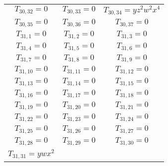 \documentclass[12pt]{memoireuqam1.3}
\begin{document}
\begin{longtable}{|c|c|c|}
$T_{30,32}= 0$&

$T_{30,33}= 0$&

$T_{30,34}= yz^2w^2x^4$\\

$T_{30,35}= 0$&

$T_{30,36}= 0$&

$T_{30,37}= 0$\\

$T_{31,1}= 0$&

$T_{31,2}= 0$&

$T_{31,3}= 0$\\

$T_{31,4}= 0$&

$T_{31,5}= 0$&

$T_{31,6}= 0$\\

$T_{31,7}= 0$&

$T_{31,8}= 0$&

$T_{31,9}= 0$\\

$T_{31,10}= 0$&

$T_{31,11}= 0$&

$T_{31,12}= 0$\\

$T_{31,13}= 0$&

$T_{31,14}= 0$&

$T_{31,15}= 0$\\

$T_{31,16}= 0$&

$T_{31,17}= 0$&

$T_{31,18}= 0$\\

$T_{31,19}= 0$&

$T_{31,20}= 0$&

$T_{31,21}= 0$\\

$T_{31,22}= 0$&

$T_{31,23}= 0$&

$T_{31,24}= 0$\\

$T_{31,25}= 0$&

$T_{31,26}= 0$&

$T_{31,27}= 0$\\

$T_{31,28}= 0$&

$T_{31,29}= 0$&

$T_{31,30}= 0$\\

$T_{31,31}= ywx^2$&


\end{longtable}
\end{document}
